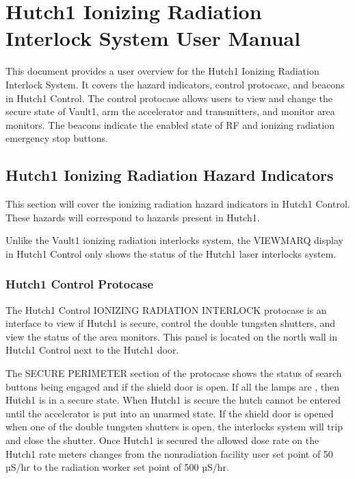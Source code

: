 \documentclass[letterpaper,10pt,english]{sphinxmanual}
\begin{document}
\section{Hutch\sphinxhyphen{}1 Ionizing Radiation Interlock System User Manual}
\label{\detokenize{user_documentation/Hutch-1_ionizing_radiation:hutch-1-ionizing-radiation-interlock-system-user-manual}}\label{\detokenize{user_documentation/Hutch-1_ionizing_radiation::doc}}
\sphinxAtStartPar
This document provides a user overview for the Hutch\sphinxhyphen{}1 Ionizing Radiation Interlock System.
It covers the hazard indicators, control protocase, and beacons in Hutch\sphinxhyphen{}1 Control.
The control protocase allows users to view and change the secure state of Vault\sphinxhyphen{}1, arm the accelerator and transmitters, and monitor area monitors.
The beacons indicate the enabled state of RF and ionizing radiation emergency stop buttons.


\subsection{Hutch\sphinxhyphen{}1 Ionizing Radiation Hazard Indicators}
\label{\detokenize{user_documentation/Hutch-1_ionizing_radiation:hutch-1-ionizing-radiation-hazard-indicators}}
\sphinxAtStartPar
This section will cover the ionizing radiation hazard indicators in Hutch\sphinxhyphen{}1 Control.
These hazards will correspond to hazards present in Hutch\sphinxhyphen{}1.

\sphinxAtStartPar
Unlike the Vault\sphinxhyphen{}1 ionizing radiation interlocks system, the VIEWMARQ display in Hutch\sphinxhyphen{}1 Control only shows the status of the Hutch\sphinxhyphen{}1 laser interlocks system.


\subsubsection{Hutch\sphinxhyphen{}1 Control Protocase}
\label{\detokenize{user_documentation/Hutch-1_ionizing_radiation:hutch-1-control-protocase}}
\sphinxAtStartPar
The Hutch\sphinxhyphen{}1 Control IONIZING RADIATION INTERLOCK protocase is an interface to view if Hutch\sphinxhyphen{}1 is secure, control the double tungsten shutters, and view the status of the area monitors.
This panel is located on the north wall in Hutch\sphinxhyphen{}1 Control next to the Hutch\sphinxhyphen{}1 door.

\sphinxAtStartPar
The SECURE PERIMETER section of the protocase shows the status of search buttons being engaged and if the shield door is open.
If all the lamps are , then Hutch\sphinxhyphen{}1 is in a secure state. When Hutch\sphinxhyphen{}1 is secure the hutch cannot be entered until the accelerator is put into an unarmed state.
If the shield door is opened when one of the double tungsten shutters is open, the interlocks system will trip and close the shutter.
Once Hutch\sphinxhyphen{}1 is secured the allowed dose rate on the Hutch\sphinxhyphen{}1 rate meters changes from the non\sphinxhyphen{}radiation facility user set point of 50 µS/hr to the radiation worker set point of 500 µS/hr.
\end{document}
